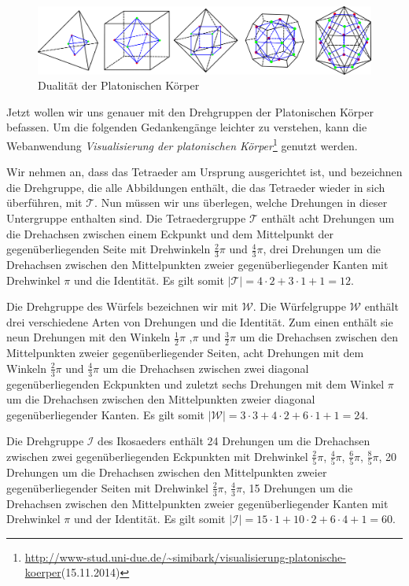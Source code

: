 \begin{figure}[H]
\centering
\includegraphics[width=0.9\linewidth]{grafiken/dual_platonische_koerper.pdf}
\caption{Dualität der Platonischen Körper}
\label{fig:Dual_Platonische_Koerper}
\end{figure}

Jetzt wollen wir uns genauer mit den Drehgruppen der Platonischen Körper befassen. Um die folgenden Gedankengänge leichter zu verstehen, kann die Webanwendung \textit{Visualisierung der platonischen Körper}\footnote{\url{http://www-stud.uni-due.de/~simibark/visualisierung-platonische-koerper}(15.11.2014)} genutzt werden.

Wir nehmen an, dass das Tetraeder am Ursprung ausgerichtet ist, und bezeichnen die Drehgruppe, die alle Abbildungen enthält, die das Tetraeder wieder in sich überführen, mit $\mathcal{T}$. Nun müssen wir uns überlegen, welche Drehungen in dieser Untergruppe enthalten sind. Die Tetraedergruppe $\mathcal{T}$ enthält acht Drehungen um die Drehachsen zwischen einem Eckpunkt und dem Mittelpunkt der gegenüberliegenden Seite mit Drehwinkeln $\frac{2}{3}\pi$ und $\frac{4}{3}\pi$, drei Drehungen um die Drehachsen zwischen den Mittelpunkten zweier gegenüberliegender Kanten mit Drehwinkel $\pi$ und die Identität. Es gilt somit $| \mathcal{T} | = 4 \cdot 2 + 3 \cdot 1 + 1 = 12$.

Die Drehgruppe des Würfels bezeichnen wir mit $\mathcal{W}$. Die Würfelgruppe $\mathcal{W}$ enthält drei verschiedene Arten von Drehungen und die Identität. Zum einen enthält sie neun Drehungen mit den Winkeln $\frac{1}{2}\pi$ ,$\pi$ und $\frac{3}{2}\pi$ um die Drehachsen zwischen den Mittelpunkten zweier gegenüberliegender Seiten, acht Drehungen mit dem Winkeln $\frac{2}{3}\pi$ und $\frac{4}{3}\pi$ um die Drehachsen zwischen zwei diagonal gegenüberliegenden Eckpunkten und zuletzt sechs Drehungen mit dem Winkel $\pi$ um die Drehachsen zwischen den Mittelpunkten zweier diagonal gegenüberliegender Kanten. Es gilt somit $| \mathcal{W} | = 3 \cdot 3 + 4 \cdot 2 + 6 \cdot 1 + 1 = 24$.

Die Drehgruppe $\mathcal{I}$ des Ikosaeders enthält 24 Drehungen um die Drehachsen zwischen zwei gegenüberliegenden Eckpunkten mit Drehwinkel $\frac{2}{5}\pi$, $\frac{4}{5}\pi$, $\frac{6}{5}\pi$, $\frac{8}{5}\pi$, 20 Drehungen um die Drehachsen zwischen den Mittelpunkten zweier gegenüberliegender Seiten mit Drehwinkel $\frac{2}{3}\pi$, $\frac{4}{3}\pi$, 15 Drehungen um die Drehachsen zwischen den Mittelpunkten zweier gegenüberliegender Kanten mit Drehwinkel $\pi$ und der Identität. Es gilt somit $| \mathcal{I} | = 15 \cdot 1 + 10 \cdot 2 + 6 \cdot 4 + 1 = 60$.

